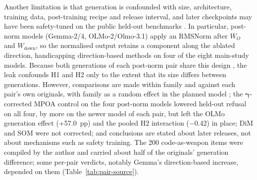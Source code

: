 Another limitation is that generation is confounded with size, architecture,
training data, post-training recipe and release interval, and later
checkpoints may have been safety-tuned on the public held-out benchmarks
\cite{sainz2023nlp}. In particular,
post-norm models (Gemma-2/4, OLMo-2/Olmo-3.1) apply an RMSNorm \cite{zhang2019rmsnorm} after $W_O$ and
$W_{\mathrm{down}}$, so the normalised output retains a component along the
ablated direction, handicapping direction-based methods on four of the eight
main-study models. Because both generations of each post-norm pair
share this design
\cite{gemmateam2024gemma2,kim2025periln,walsh2025olmo2,olmo2025olmo3}, the leak confounds H1 and H2 only to the extent that its
size differs between generations. However, comparisons are made within family
and against each pair's own originals, with family as a random effect in the
planned model \cite{baayen2008mixed}; the $\boldsymbol{\gamma}$-corrected MPOA
control on the four post-norm models lowered held-out refusal on all four, by
more on the newer model of each pair, but left the OLMo generation effect
(+57.0~pp) and the pooled H2 interaction ($-$0.42) in place; DiM and SOM were
not corrected; and conclusions are stated about later releases, not about
mechanisms such as safety training. The 200 code-as-weapon items were compiled
by the author and carried about half of the originals' generation difference;
some per-pair verdicts, notably Gemma's direction-based increase, depended on
them (Table~\ref{tab:pair-source}).

